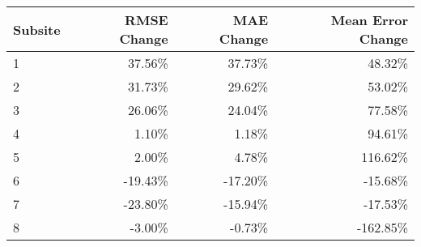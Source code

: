 \begin{tabular}{lrrr}
\toprule
Subsite &  RMSE Change & MAE Change & Mean Error Change \\
\midrule
1 & 37.56\% & 37.73\% & 48.32\% \\
2 & 31.73\% & 29.62\% & 53.02\% \\
3 & 26.06\% & 24.04\% & 77.58\% \\
4 & 1.10\% & 1.18\% & 94.61\% \\
5 & 2.00\% & 4.78\% & 116.62\% \\
6 & -19.43\% & -17.20\% & -15.68\% \\
7 & -23.80\% & -15.94\% & -17.53\% \\
8 & -3.00\% & -0.73\% & -162.85\% \\
\bottomrule
\end{tabular}
